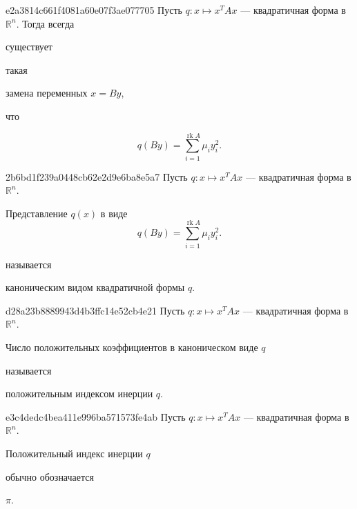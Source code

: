\begin{note}{e2a3814c661f4081a60e07f3ae077705}
    Пусть \({ q : x \mapsto x^{T}Ax }\) --- квадратичная форма в \({ \mathbb R^{n} }\).
    Тогда всегда \begin{icloze}{3}существует\end{icloze} такая \begin{icloze}{2}замена переменных \({ x = By }\),\end{icloze} что
    \begin{icloze}{1}
        \[
            q(By) = \sum_{i=1}^{\operatorname{rk} A} \mu_i y_i^2.
        \]
    \end{icloze}
\end{note}

\begin{note}{2b6bd1f239a0448cb62e2d9e6ba8e5a7}
    Пусть \({ q : x \mapsto x^{T}Ax }\) --- квадратичная форма в \({ \mathbb R^{n} }\).
    \begin{icloze}{1}
        Представление \({ q(x) }\) в виде
        \[
            q(By) = \sum_{i=1}^{\operatorname{rk} A} \mu_i y_i^2.
        \]
    \end{icloze}
    называется \begin{icloze}{2}каноническим видом квадратичной формы \({ q }\).\end{icloze}
\end{note}

\begin{note}{d28a23b8889943d4b3ffc14e52cb4e21}
    Пусть \({ q : x \mapsto x^{T}Ax }\) --- квадратичная форма в \({ \mathbb R^{n} }\).
    \begin{icloze}{1}Число положительных коэффициентов в каноническом виде \({ q }\)\end{icloze} называется \begin{icloze}{2}положительным индексом инерции \({ q }\).\end{icloze}
\end{note}

\begin{note}{e3c4dedc4bea411e996ba571573fe4ab}
    Пусть \({ q : x \mapsto x^{T}Ax }\) --- квадратичная форма в \({ \mathbb R^{n} }\).
    \begin{icloze}{2}Положительный индекс инерции \({ q }\)\end{icloze} обычно обозначается \begin{icloze}{1}\({ \pi }\).\end{icloze}
\end{note}

